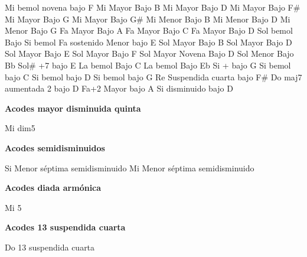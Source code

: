 \upchord{\EflatnineCGuitar}Mi bemol novena bajo F \hfill
\upchord{\EBGuitar}Mi Mayor Bajo B \hfill\null\break
\vskip 20pt
\upchord{\EDGuitar}Mi Mayor Bajo D \hfill
\upchord{\EFsGuitar}Mi Mayor Bajo F\# \hfill
\upchord{\EGGuitar}Mi Mayor Bajo G \hfill
\upchord{\EGsGuitar}Mi Mayor Bajo G\# \hfill\null\break
\vskip 20pt
\upchord{\EmBGuitar}Mi Menor Bajo B \hfill
\upchord{\EmDGuitar}Mi Menor Bajo D \hfill
\upchord{\EmGGuitar}Mi Menor Bajo G \hfill
\upchord{\FAGuitar}Fa Mayor Bajo A \hfill\null\break
\vskip 20pt
\upchord{\FCGuitar}Fa Mayor Bajo C \hfill
\upchord{\FDGuitar}Fa Mayor Bajo D \hfill
\upchord{\GflatBflatGuitar}Sol bemol Bajo Si bemol \hfill\null\break
\vskip 20pt
\upchord{\FsmEGuitar}Fa sostenido Menor bajo E \hfill
\upchord{\GBGuitar}Sol Mayor Bajo B \hfill
\upchord{\GDGuitar}Sol Mayor Bajo D \hfill
\upchord{\GEGuitar}Sol Mayor Bajo E \hfill\null\break
\vskip 20pt
\upchord{\GFGuitar}Sol Mayor Bajo F \hfill
\upchord{\GnineDGuitar}Sol Mayor Novena Bajo D \hfill
\upchord{\GmBflatGuitar}Sol Menor Bajo Bb \hfill\null\break
\vskip 20pt
\upchord{\GsmajsevenEGuitar} Sol\# +7 bajo E \hfill
\upchord{\AflatCGuitar}La bemol Bajo C \hfill
\upchord{\AflatEflatGuitar}La bemol Bajo Eb \hfill
\upchord{\BmajsevenGGuitar}Si + bajo G \hfill\null\break
\vskip 20pt
\upchord{\BflatCGuitar}Si bemol bajo C \hfill
\upchord{\BflatDGuitar}Si bemol bajo D \hfill
\upchord{\BflatGGuitar}Si bemol bajo G \hfill\null\break
\vskip 20pt
\upchord{\DsusFsGuitar}Re Suspendida cuarta bajo F\# \hfill\null\break
\upchord{\CMajtwoDGuitar} Do maj7 aumentada 2 bajo D \hfill\null\break
\vskip 20pt
\upchord{\FtwoAGuitar}Fa+2 Mayor bajo A \hfill
\upchord{\BdimDGuitar}Si disminuido bajo D \hfill\null\break
\normalsize

\vskip 20pt
\textbf{Acodes mayor disminuida quinta}

\small
\upchord{\EdimfiveGuitar}Mi dim5
\normalsize

\vskip 20pt
\textbf{Acodes semidisminuidos}

\small
\upchord{\BmsevenbfiveGuitar}Si Menor s\'eptima semidisminuido
\upchord{\EdimfiveGuitar}Mi Menor s\'eptima semidisminuido
\normalsize

\vskip 20pt
\textbf{Acodes diada arm\'onica}

\small
\upchord{\EfiveGuitar}Mi 5
\normalsize

\vskip 20pt
\textbf{Acodes 13 suspendida cuarta}

\small
\upchord{\CsusthirteenGuitar}Do 13 suspendida cuarta
\normalsize

\clearpage
\fi

